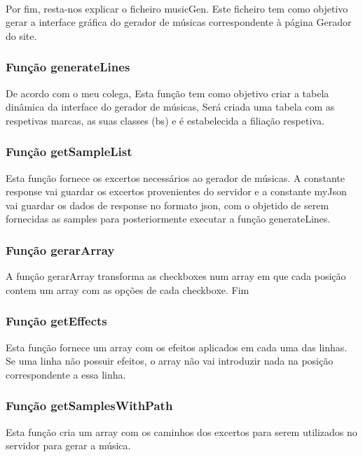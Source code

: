 \documentclass{report}
\begin{document}
\paragraph{}

Por fim, resta-nos explicar o ficheiro musicGen. Este ficheiro tem como objetivo gerar a interface gráfica 
do gerador de músicas correspondente à página Gerador do site.
\subsubsection{Função generateLines}
\hspace{5pt}De acordo com o meu colega, Esta função tem como objetivo criar a tabela dinâmica da interface 
do gerador de músicas, Será criada uma tabela com as respetivas marcas, as suas classes (\ac{bs}) e é 
estabelecida a filiação respetiva.

\subsubsection{Função getSampleList}
\hspace{5pt}Esta função fornece os excertos necessários ao gerador de músicas. A constante response vai 
guardar os excertos provenientes do servidor e a constante myJson vai guardar os dados de response no formato 
\ac{json}, com o objetido de serem fornecidas as samples para posteriormente executar a função generateLines.

\subsubsection{Função gerarArray}
\hspace{5pt} A função gerarArray transforma as checkboxes num array em que cada posição contem um array com 
as opções de cada checkboxe. Fim

\subsubsection{Função getEffects}
\hspace{5pt}Esta função fornece um array com os efeitos aplicados em cada uma das linhas. Se uma linha não 
possuir efeitos, o array não vai introduzir nada na posição correspondente a essa linha.

\subsubsection{Função getSamplesWithPath}
\hspace{5pt}Esta função cria um array com os caminhos dos excertos para serem utilizados no servidor para 
gerar a música.
\end{document}

